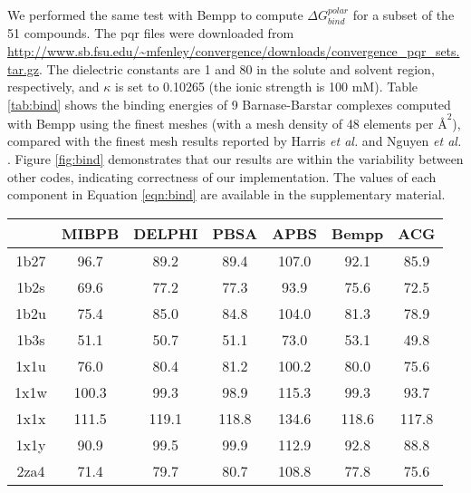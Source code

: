 We performed the same test with Bempp to compute $\Delta G^{polar}_{bind}$ for a subset of the 51 compounds.
The pqr files were downloaded from \url{http://www.sb.fsu.edu/~mfenley/convergence/downloads/convergence_pqr_sets.tar.gz}.
The dielectric constants are 1 and 80 in the solute and solvent region, respectively, and $\kappa$ is set to 0.10265 (the ionic strength is 100 mM).
Table \ref{tab:bind} shows the binding energies of 9 Barnase-Barstar complexes computed with Bempp using the finest meshes (with a mesh density of 48 elements per $\si{\angstrom}^2$), compared with the finest mesh results reported by Harris \emph{et al.} \cite{HarrisBoschitcshFenley2013} and Nguyen \emph{et al.} \cite{nguyenAccurateRobustReliable2017}.
Figure \ref{fig:bind} demonstrates that our results are within the variability between other codes, indicating correctness of our implementation.
The values of each component in Equation \ref{eqn:bind} are available in the supplementary material.

\begin{table*}[]
    \centering
    \begin{tabular}{c|c|c|c|c|c|c}
         & MIBPB & DELPHI & PBSA  & APBS  & Bempp & ACG \\ \hline
    1b27 & 96.7  & 89.2   & 89.4  & 107.0 & 92.1  & 85.9   \\
    1b2s & 69.6  & 77.2   & 77.3  & 93.9  & 75.6  & 72.5   \\
    1b2u & 75.4  & 85.0   & 84.8  & 104.0 & 81.3  & 78.9   \\
    1b3s & 51.1  & 50.7   & 51.1  & 73.0  & 53.1  & 49.8   \\
    1x1u & 76.0  & 80.4   & 81.2  & 100.2 & 80.0  & 75.6   \\
    1x1w & 100.3 & 99.3   & 98.9  & 115.3 & 99.3  & 93.7   \\
    1x1x & 111.5 & 119.1  & 118.8 & 134.6 & 118.6 & 117.8  \\
    1x1y & 90.9  & 99.5   & 99.9  & 112.9 & 92.8  & 88.8   \\
    2za4 & 71.4  & 79.7   & 80.7  & 108.8 & 77.8  & 75.6  
    \end{tabular}
    \caption{Binding free energies $\Delta G^{polar}_{bind}$ of the Barnase-Barstar complexes using different PB solvers.
    Energies are in units of kcal/mol. The first 4 columns were taken from the work by Nguyen \emph{et al.} \cite{nguyenAccurateRobustReliable2017} and the last column from Harris \emph{et al.} \cite{HarrisBoschitcshFenley2013} }
    \label{tab:bind}
\end{table*}

